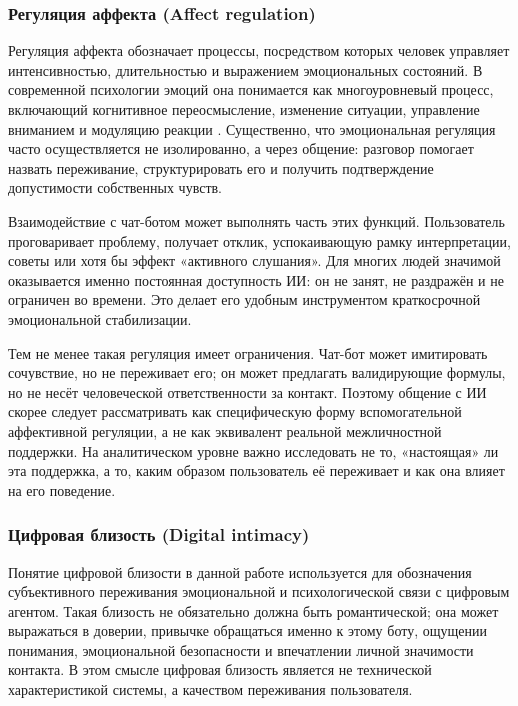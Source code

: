 \documentclass[areasetadvanced]{scrartcl}
\begin{document}
\subsubsection{Регуляция аффекта (Affect regulation)}

Регуляция аффекта обозначает процессы, посредством которых человек
управляет интенсивностью, длительностью и выражением эмоциональных
состояний. В современной психологии эмоций она понимается как
многоуровневый процесс, включающий когнитивное переосмысление,
изменение ситуации, управление вниманием и модуляцию реакции
\cite{Gross1998}. Существенно, что эмоциональная регуляция часто
осуществляется не изолированно, а через общение: разговор помогает
назвать переживание, структурировать его и получить подтверждение
допустимости собственных чувств.

Взаимодействие с чат-ботом может выполнять часть этих
функций. Пользователь проговаривает проблему, получает отклик,
успокаивающую рамку интерпретации, советы или хотя бы эффект
«активного слушания». Для многих людей значимой оказывается именно
постоянная доступность ИИ: он не занят, не раздражён и не ограничен во
времени. Это делает его удобным инструментом краткосрочной
эмоциональной стабилизации.

Тем не менее такая регуляция имеет ограничения. Чат-бот может
имитировать сочувствие, но не переживает его; он может предлагать
валидирующие формулы, но не несёт человеческой ответственности за
контакт. Поэтому общение с ИИ скорее следует рассматривать как
специфическую форму вспомогательной аффективной регуляции, а не как
эквивалент реальной межличностной поддержки. На аналитическом уровне
важно исследовать не то, «настоящая» ли эта поддержка, а то, каким
образом пользователь её переживает и как она влияет на его поведение.

\subsubsection{Цифровая близость (Digital intimacy)}

Понятие цифровой близости в данной работе используется для обозначения
субъективного переживания эмоциональной и психологической связи с
цифровым агентом. Такая близость не обязательно должна быть
романтической; она может выражаться в доверии, привычке обращаться
именно к этому боту, ощущении понимания, эмоциональной безопасности и
впечатлении личной значимости контакта. В этом смысле цифровая
близость является не технической характеристикой системы, а качеством
переживания пользователя.
\end{document}

